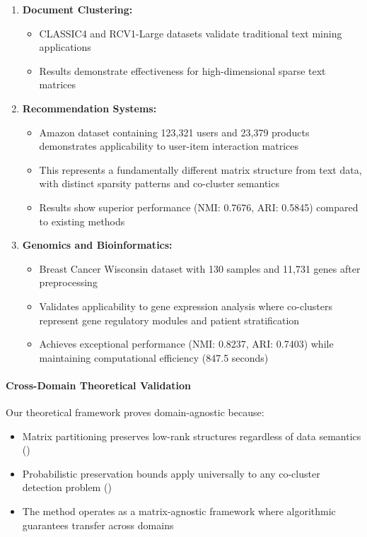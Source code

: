 \documentclass{ar2rc}
\theoremstyle{definition}
\theoremstyle{remark} %
\begin{document}
\begin{enumerate}
  \item \textbf{Document Clustering:}
        \begin{itemize}
          \item CLASSIC4 and RCV1-Large datasets validate traditional text mining applications
          \item Results demonstrate effectiveness for high-dimensional sparse text matrices
        \end{itemize}

  \item \textbf{Recommendation Systems:}
        \begin{itemize}
          \item Amazon dataset containing 123,321 users and 23,379 products demonstrates applicability to user-item interaction matrices
          \item This represents a fundamentally different matrix structure from text data, with distinct sparsity patterns and co-cluster semantics
          \item Results show superior performance (NMI: 0.7676, ARI: 0.5845) compared to existing methods
        \end{itemize}

  \item \textbf{Genomics and Bioinformatics:}
        \begin{itemize}
          \item Breast Cancer Wisconsin dataset with 130 samples and 11,731 genes after preprocessing
          \item Validates applicability to gene expression analysis where co-clusters represent gene regulatory modules and patient stratification
          \item Achieves exceptional performance (NMI: 0.8237, ARI: 0.7403) while maintaining computational efficiency (847.5 seconds)
        \end{itemize}
\end{enumerate}

\paragraph{Cross-Domain Theoretical Validation}

Our theoretical framework proves domain-agnostic because:
\begin{itemize}
  \item Matrix partitioning preserves low-rank structures regardless of data semantics ()
  \item Probabilistic preservation bounds apply universally to any co-cluster detection problem ()
  \item The method operates as a matrix-agnostic framework where algorithmic guarantees transfer across domains
\end{itemize}
\end{document}
